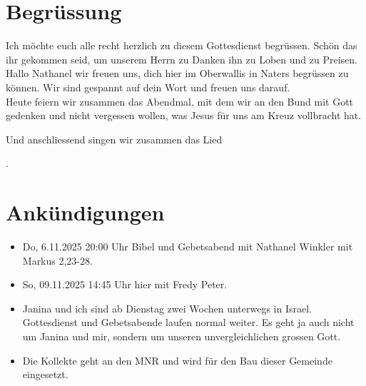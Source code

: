 \documentclass{mybib}
\begin{document}
\section{Begrüssung}

Ich möchte euch alle recht herzlich zu diesem Gottesdienst begrüssen. Schön das ihr gekommen seid, um unserem Herrn zu Danken ihn zu Loben und zu Preisen.
Hallo Nathanel wir freuen uns, dich hier im Oberwallis in Naters begrüssen zu können. Wir sind gespannt auf dein Wort und freuen uns darauf.\\
Heute feiern wir zusammen das Abendmal, mit dem wir an den Bund mit Gott gedenken und nicht vergessen wollen, was Jesus für uns am Kreuz vollbracht hat.

\beten{} Und anschliessend singen wir zusammen das Lied

{}.

\section{Ankündigungen}
\begin{itemize}
    \item {} Do, 6.11.2025 20:00 Uhr Bibel und Gebetsabend mit Nathanel Winkler mit Markus 2,23-28.
    \item {} So, 09.11.2025 14:45 Uhr hier mit Fredy Peter.
    \item {} Janina und ich sind ab Dienstag zwei Wochen unterwegs in Israel. Gottesdienst und Gebetsabende laufen normal weiter. Es geht ja auch nicht um Janina und mir, sondern um unseren unvergleichlichen grossen Gott. 
    \item {} Die Kollekte geht an den MNR und wird für den Bau dieser Gemeinde eingesetzt.
\end{itemize}
\end{document}

